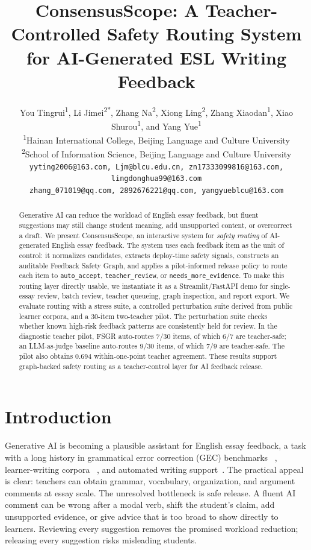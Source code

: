 \documentclass[11pt]{article}
\title{ConsensusScope: A Teacher-Controlled Safety Routing System for AI-Generated ESL Writing Feedback}
\author{You Tingrui\textsuperscript{1}, Li Jimei\textsuperscript{2*},
  Zhang Na\textsuperscript{2}, Xiong Ling\textsuperscript{2},
  Zhang Xiaodan\textsuperscript{1}, Xiao Shurou\textsuperscript{1},
  and Yang Yue\textsuperscript{1} \\
  \textsuperscript{1}Hainan International College, Beijing Language and Culture University \\
  \textsuperscript{2}School of Information Science, Beijing Language and Culture University \\
  \texttt{yyting2006@163.com, Ljm@blcu.edu.cn, zn17333099816@163.com, lingdonghua99@163.com} \\
  \texttt{zhang\_071019@qq.com, 2892676221@qq.com, yangyueblcu@163.com}}
\begin{document}
\maketitle

\begin{abstract}
Generative AI can reduce the workload of English essay feedback, but fluent
suggestions may still change student meaning, add unsupported content, or
overcorrect a draft. We present ConsensusScope, an interactive system for
\emph{safety routing} of AI-generated English essay feedback. The system uses
each feedback item as the unit of control: it normalizes candidates, extracts
deploy-time safety signals,
constructs an auditable Feedback Safety Graph, and applies a pilot-informed
release policy to route each item to \texttt{auto\_accept},
\texttt{teacher\_review}, or \texttt{needs\_more\_evidence}. To make this
routing layer directly usable, we instantiate it as a Streamlit/FastAPI demo
for single-essay review, batch review, teacher queueing, graph inspection, and
report export. We evaluate routing with a stress suite, a controlled
perturbation suite derived from public learner corpora, and a 30-item
two-teacher pilot. The perturbation suite checks whether known high-risk
feedback patterns are consistently held for review. In the diagnostic teacher
pilot, FSGR auto-routes 7/30 items, of which 6/7 are teacher-safe; an
LLM-as-judge baseline auto-routes 9/30 items, of which 7/9 are teacher-safe.
The pilot also obtains 0.694 within-one-point teacher agreement. These results
support graph-backed safety routing as a teacher-control layer for AI feedback
release.
\end{abstract}

\section{Introduction}

Generative AI is becoming a plausible assistant for English essay feedback, a
task with a long history in grammatical error correction (GEC) benchmarks
~\cite{ng-etal-2014-conll,bryant-etal-2019-bea}, learner-writing corpora
~\cite{yannakoudakis2011fce,napoles-etal-2017-jfleg}, and automated writing
support~\cite{madnani-etal-2018-writing}. The practical appeal is clear:
teachers can obtain grammar, vocabulary, organization, and argument comments at
essay scale. The unresolved bottleneck is safe release. A fluent AI comment can
be wrong after a modal verb, shift the student's claim, add unsupported evidence,
or give advice that is too broad to show directly to learners. Reviewing every
suggestion removes the promised workload reduction; releasing every suggestion
risks misleading students.
\end{document}
